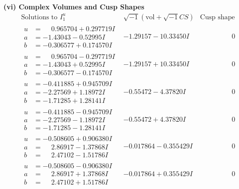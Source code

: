 \documentclass[1p]{elsarticle_modified}
\theoremstyle{definition}
\newcommand{\I}{\sqrt{-1}}
\begin{document}
\newpage\flushleft \textbf{(vi) Complex Volumes and Cusp Shapes}
$$\begin{array}{c|c|c}  
\text{Solutions to }I^u_{1}& \I (\text{vol} + \sqrt{-1}CS) & \text{Cusp shape}\\
 \hline 
\begin{aligned}
u &= \phantom{-}0.965704 + 0.297719 I \\
a &= -1.43043 - 0.52995 I \\
b &= -0.306577 + 0.174570 I\end{aligned}
 & -1.29157 - 10.33450 I & \phantom{-0.000000 } 0 \\ \hline\begin{aligned}
u &= \phantom{-}0.965704 - 0.297719 I \\
a &= -1.43043 + 0.52995 I \\
b &= -0.306577 - 0.174570 I\end{aligned}
 & -1.29157 + 10.33450 I & \phantom{-0.000000 } 0 \\ \hline\begin{aligned}
u &= -0.411885 + 0.945709 I \\
a &= -2.27569 + 1.18972 I \\
b &= -1.71285 + 1.28141 I\end{aligned}
 & -0.55472 - 4.37820 I & \phantom{-0.000000 } 0 \\ \hline\begin{aligned}
u &= -0.411885 - 0.945709 I \\
a &= -2.27569 - 1.18972 I \\
b &= -1.71285 - 1.28141 I\end{aligned}
 & -0.55472 + 4.37820 I & \phantom{-0.000000 } 0 \\ \hline\begin{aligned}
u &= -0.508605 + 0.906380 I \\
a &= \phantom{-}2.86917 - 1.37868 I \\
b &= \phantom{-}2.47102 - 1.51786 I\end{aligned}
 & -0.017864 - 0.355429 I & \phantom{-0.000000 } 0 \\ \hline\begin{aligned}
u &= -0.508605 - 0.906380 I \\
a &= \phantom{-}2.86917 + 1.37868 I \\
b &= \phantom{-}2.47102 + 1.51786 I\end{aligned}
 & -0.017864 + 0.355429 I & \phantom{-0.000000 } 0 \\ \hline\begin{aligned}

\end{aligned}
\end{array}$$
\end{document}
